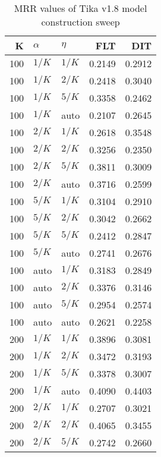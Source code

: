 
\begin{table}
\begin{spacing}{1.2}
\centering
\caption{MRR values of Tika v1.8 model construction sweep}
\label{table:tika_model_sweep}
\vspace{0.2em}
\parbox{.45\linewidth}{\centering \begin{tabular}{rll|rr}
\toprule
   K &  $\alpha$ &    $\eta$ & FLT & DIT \\
\midrule
 100 &  $1/K$ &  $1/K$ &           0.2149 & 0.2912 \\
 100 &  $1/K$ &  $2/K$ &           0.2418 & 0.3040 \\
 100 &  $1/K$ &  $5/K$ &           0.3358 & 0.2462 \\
 100 &  $1/K$ &   auto &           0.2107 & 0.2645 \\
 100 &  $2/K$ &  $1/K$ &           0.2618 & 0.3548 \\
 100 &  $2/K$ &  $2/K$ &           0.3256 & 0.2350 \\
 100 &  $2/K$ &  $5/K$ &           0.3811 & 0.3009 \\
 100 &  $2/K$ &   auto &           0.3716 & 0.2599 \\
 100 &  $5/K$ &  $1/K$ &           0.3104 & 0.2910 \\
 100 &  $5/K$ &  $2/K$ &           0.3042 & 0.2662 \\
 100 &  $5/K$ &  $5/K$ &           0.2412 & 0.2847 \\
 100 &  $5/K$ &   auto &           0.2741 & 0.2676 \\
 100 &   auto &  $1/K$ &           0.3183 & 0.2849 \\
 100 &   auto &  $2/K$ &           0.3376 & 0.3146 \\
 100 &   auto &  $5/K$ &           0.2954 & 0.2574 \\
 100 &   auto &   auto &           0.2621 & 0.2258 \\
 200 &  $1/K$ &  $1/K$ &           0.3896 & 0.3081 \\
 200 &  $1/K$ &  $2/K$ &           0.3472 & 0.3193 \\
 200 &  $1/K$ &  $5/K$ &           0.3378 & 0.3007 \\
 200 &  $1/K$ &   auto &           0.4090 & 0.4403 \\
 200 &  $2/K$ &  $1/K$ &           0.2707 & 0.3021 \\
 200 &  $2/K$ &  $2/K$ &           0.4065 & 0.3455 \\
 200 &  $2/K$ &  $5/K$ &           0.2742 & 0.2660 \\

\end{tabular}}
\end{spacing}
\end{table}
